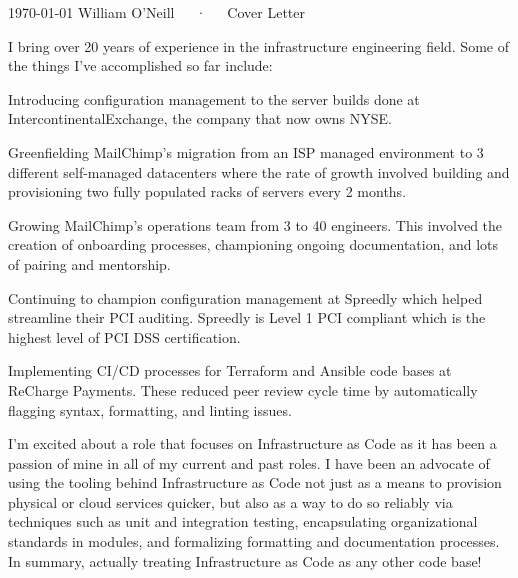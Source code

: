 \documentclass[11pt, letterpaper]{awesome-cv}
\begin{document}
\makecvheader[R]

\makecvfooter
  {\today}
  {William O'Neill~~~·~~~Cover Letter}
  {}

\makelettertitle

\begin{cvletter}

I bring over 20 years of experience in the infrastructure engineering field. Some of the things I’ve accomplished so far include:

\begin{cvitems}
\item{Introducing configuration management to the server builds done at IntercontinentalExchange, the company that now owns NYSE.}
\item{Greenfielding MailChimp’s migration from an ISP managed environment to 3 different self-managed datacenters where the rate of growth involved building and provisioning two fully populated racks of servers every 2 months.}
\item{Growing MailChimp’s operations team from 3 to 40 engineers. This involved the creation of onboarding processes, championing ongoing documentation, and lots of pairing and mentorship.}
\item{Continuing to champion configuration management at Spreedly which helped streamline their PCI auditing. Spreedly is Level 1 PCI compliant which is the highest level of PCI DSS certification.}
\item{Implementing CI/CD processes for Terraform and Ansible code bases at ReCharge Payments. These reduced peer review cycle time by automatically flagging syntax, formatting, and linting issues.}
\end{cvitems}

I'm excited about a role that focuses on Infrastructure as Code as it has been a passion of mine in all of my current and past roles. I have been an advocate of using the tooling behind Infrastructure as Code not just as a means
to provision physical or cloud services quicker, but also as a way to do so reliably via techniques such as unit and integration testing, encapsulating organizational standards in modules, and formalizing formatting and documentation processes.
In summary, actually treating Infrastructure as Code as any other code base!

\end{cvletter}


\makeletterclosing
\end{document}
